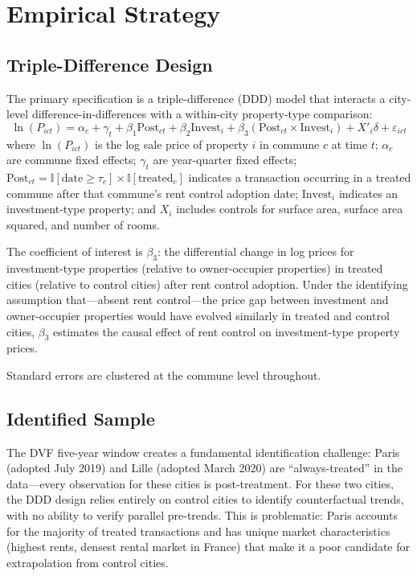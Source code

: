 \documentclass[12pt]{article}
\newcommand{\ind}{\mathbb{I}}
\begin{document}
\section{Empirical Strategy}

\subsection{Triple-Difference Design}

The primary specification is a triple-difference (DDD) model that interacts a city-level difference-in-differences with a within-city property-type comparison:
\begin{equation}
\ln(P_{ict}) = \alpha_c + \gamma_t + \beta_1 \text{Post}_{ct} + \beta_2 \text{Invest}_i + \beta_3 (\text{Post}_{ct} \times \text{Invest}_i) + X'_i\delta + \varepsilon_{ict}
\label{eq:ddd}
\end{equation}
where $\ln(P_{ict})$ is the log sale price of property $i$ in commune $c$ at time $t$; $\alpha_c$ are commune fixed effects; $\gamma_t$ are year-quarter fixed effects; $\text{Post}_{ct} = \ind[\text{date} \geq \tau_c] \times \ind[\text{treated}_c]$ indicates a transaction occurring in a treated commune after that commune's rent control adoption date; $\text{Invest}_i$ indicates an investment-type property; and $X_i$ includes controls for surface area, surface area squared, and number of rooms.

The coefficient of interest is $\beta_3$: the differential change in log prices for investment-type properties (relative to owner-occupier properties) in treated cities (relative to control cities) after rent control adoption. Under the identifying assumption that---absent rent control---the price gap between investment and owner-occupier properties would have evolved similarly in treated and control cities, $\beta_3$ estimates the causal effect of rent control on investment-type property prices.

Standard errors are clustered at the commune level throughout.

\subsection{Identified Sample}

The DVF five-year window creates a fundamental identification challenge: Paris (adopted July 2019) and Lille (adopted March 2020) are ``always-treated'' in the data---every observation for these cities is post-treatment. For these two cities, the DDD design relies entirely on control cities to identify counterfactual trends, with no ability to verify parallel pre-trends. This is problematic: Paris accounts for the majority of treated transactions and has unique market characteristics (highest rents, densest rental market in France) that make it a poor candidate for extrapolation from control cities.
\end{document}
